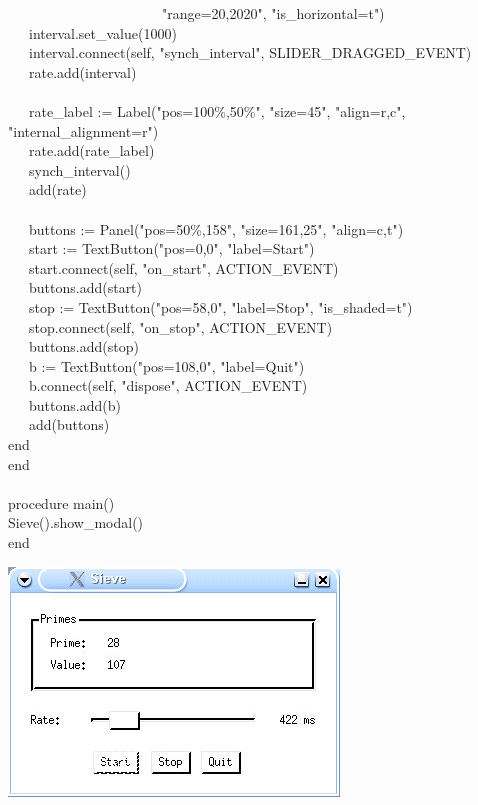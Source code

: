 {\>   \ \ \ \ \ \ \ \ \ \ \ \ \ \ \ \ \ \ \ \ \ \ "range=20,2020", "is\_horizontal=t") \\
\>   \ \ \ interval.set\_value(1000) \\
\>   \ \ \ interval.connect(self,
"synch\_interval", SLIDER\_DRAGGED\_EVENT) \\
\>   \ \ \ rate.add(interval) \\
\ \\
\>   \ \ \ rate\_label := Label("pos=100\%,50\%", "size=45", "align=r,c", \\
\>\>\>\>"internal\_alignment=r") \\
\>   \ \ \ rate.add(rate\_label) \\
\>   \ \ \ synch\_interval() \\
\>   \ \ \ add(rate) \\
\ \\
\>   \ \ \ buttons := Panel("pos=50\%,158",
"size=161,25",
"align=c,t") \\
\>   \ \ \ start := TextButton("pos=0,0",
"label=Start") \\
\>   \ \ \ start.connect(self, "on\_start",
ACTION\_EVENT) \\
\>   \ \ \ buttons.add(start) \\
\>   \ \ \ stop := TextButton("pos=58,0",
"label=Stop",
"is\_shaded=t") \\
\>   \ \ \ stop.connect(self, "on\_stop",
ACTION\_EVENT) \\
\>   \ \ \ buttons.add(stop) \\
\>   \ \ \ b := TextButton("pos=108,0",
"label=Quit") \\
\>   \ \ \ b.connect(self, "dispose",
ACTION\_EVENT) \\
\>   \ \ \ buttons.add(b) \\
\>   \ \ \ add(buttons) \\
\>   end \\
end \\
\ \\
procedure main() \\
\>   Sieve().show\_modal() \\
end
}

\bigskip

\begin{center}
\includegraphics[width=3.4575in,height=2.3953in]{ub-img/ub-img58.jpg}
\end{center}

